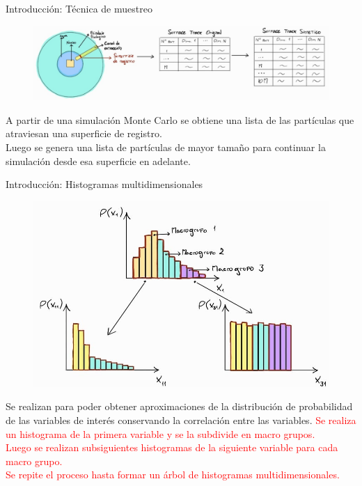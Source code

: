 \documentclass[aspectratio=169,english]{beamer}
\begin{document}
\begin{frame}{Introducción: Técnica de muestreo}
    \begin{figure}
        \centering
        \includegraphics[width=0.95\linewidth]{imagens/esquema1.jpeg}
        \label{fig:esquema1}
    \end{figure}

    A partir de una simulación Monte Carlo se obtiene una lista de las partículas que atraviesan una superficie de registro.\\
    \newline
    Luego se genera una lista de partículas de mayor tamaño para continuar la simulación desde esa superficie en adelante.
\end{frame}

\begin{frame}{Introducción: Histogramas multidimensionales}
    \begin{figure}
        \centering
        \includegraphics[width=0.35\linewidth]{imagens/esquema2.jpeg}
        \label{fig:esquema2}
    \end{figure}

    Se realizan para poder obtener aproximaciones de la distribución de probabilidad de las variables de interés conservando la correlación entre las variables.
    \textcolor{red}{Se realiza un histograma de la primera variable y se la subdivide en macro grupos. \\}
    \textcolor{red}{Luego se realizan subsiguientes histogramas de la siguiente variable para cada macro grupo. \\}
    \textcolor{red}{Se repite el proceso hasta formar un árbol de histogramas multidimensionales.\\}
    
\end{frame}
\end{document}
